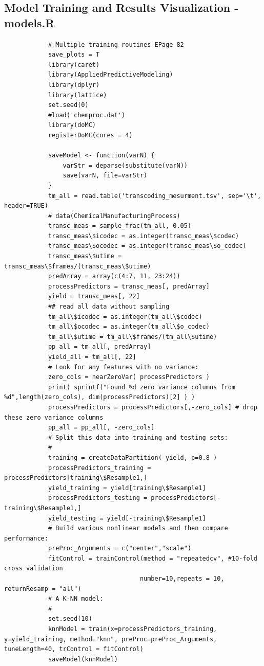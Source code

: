 \documentclass[letterpaper,12pt,titlepage,oneside,final]{report}
\begin{document}
        \subsection {Model Training and Results Visualization - models.R}
        \begin{multicols}{2}
        \begin{verbatim}
            # Multiple training routines EPage 82
            save_plots = T
            library(caret)
            library(AppliedPredictiveModeling)
            library(dplyr)
            library(lattice)
            set.seed(0)
            #load('chemproc.dat')
            library(doMC)
            registerDoMC(cores = 4)

            saveModel <- function(varN) {
                varStr = deparse(substitute(varN))
                save(varN, file=varStr)
            }
            tm_all = read.table('transcoding_mesurment.tsv', sep='\t', header=TRUE)
            # data(ChemicalManufacturingProcess)
            transc_meas = sample_frac(tm_all, 0.05)
            transc_meas\$icodec = as.integer(transc_meas\$codec)
            transc_meas\$ocodec = as.integer(transc_meas\$o_codec)
            transc_meas\$utime = transc_meas\$frames/(transc_meas\$utime)
            predArray = array(c(4:7, 11, 23:24))
            processPredictors = transc_meas[, predArray]
            yield = transc_meas[, 22]
            ## read all data without sampling
            tm_all\$icodec = as.integer(tm_all\$codec)
            tm_all\$ocodec = as.integer(tm_all\$o_codec)
            tm_all\$utime = tm_all\$frames/(tm_all\$utime)
            pp_all = tm_all[, predArray]
            yield_all = tm_all[, 22]
            # Look for any features with no variance:
            zero_cols = nearZeroVar( processPredictors )
            print( sprintf("Found %d zero variance columns from %d",length(zero_cols), dim(processPredictors)[2] ) )
            processPredictors = processPredictors[,-zero_cols] # drop these zero variance columns 
            pp_all = pp_all[, -zero_cols]
            # Split this data into training and testing sets:
            #
            training = createDataPartition( yield, p=0.8 )
            processPredictors_training = processPredictors[training\$Resample1,]
            yield_training = yield[training\$Resample1]
            processPredictors_testing = processPredictors[-training\$Resample1,]
            yield_testing = yield[-training\$Resample1]
            # Build various nonlinear models and then compare performance:
            preProc_Arguments = c("center","scale")
            fitControl = trainControl(method = "repeatedcv", #10-fold cross validation
                                     number=10,repeats = 10, returnResamp = "all")
            # A K-NN model:
            # 
            set.seed(10)
            knnModel = train(x=processPredictors_training, y=yield_training, method="knn", preProc=preProc_Arguments, tuneLength=40, trControl = fitControl)
            saveModel(knnModel)


\end{verbatim}
\end{multicols}
\end{document}
